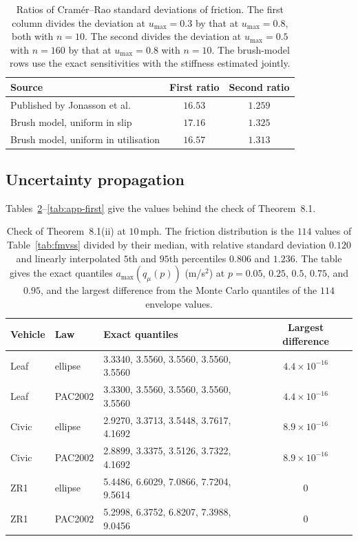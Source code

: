 \documentclass[12pt, twoside]{amsart}
\theoremstyle{definition}
\newcommand{\amax}{a_{\max}}
\newcommand{\mainref}[2]{#2}
\begin{document}
\begin{table}[htbp]
\centering\small
\caption{Ratios of Cram\'er--Rao standard deviations of friction. The first column divides the deviation at $u_{\max}=0.3$ by that at $u_{\max}=0.8$, both with $n=10$. The second divides the deviation at $u_{\max}=0.5$ with $n=160$ by that at $u_{\max}=0.8$ with $n=10$. The brush-model rows use the exact sensitivities with the stiffness estimated jointly.}\label{tab:app-volvo}
\begin{tabular}{lcc}
\toprule
Source & First ratio & Second ratio\\
\midrule
Published by Jonasson et al. & $16.53$ & $1.259$\\
Brush model, uniform in slip & $17.16$ & $1.325$\\
Brush model, uniform in utilisation & $16.57$ & $1.313$\\
\bottomrule
\end{tabular}
\end{table}
\FloatBarrier

\subsection{Uncertainty propagation}

Tables~\ref{tab:app-quant}--\ref{tab:app-first} give the values behind the check of
Theorem~\mainref{thm:propagation}{8.1}.

\begin{table}[htbp]
\centering\small
\caption{Check of Theorem~\mainref{thm:propagation}{8.1}\mainref{pr:quant}{{(ii)}} at $10$\,mph. The friction distribution is the $114$ values of Table~\ref{tab:fmvss} divided by their median, with relative standard deviation $0.120$ and linearly interpolated $5$th and $95$th percentiles $0.806$ and $1.236$. The table gives the exact quantiles $\amax(q_\mu(p))$ (m/s$^2$) at $p=0.05$, $0.25$, $0.5$, $0.75$, and $0.95$, and the largest difference from the Monte Carlo quantiles of the $114$ envelope values.}\label{tab:app-quant}
\begin{tabular}{llp{6.2cm}c}
\toprule
Vehicle & Law & Exact quantiles & Largest difference\\
\midrule
Leaf & ellipse & 3.3340, 3.5560, 3.5560, 3.5560, 3.5560 & $4.4\times10^{-16}$\\
Leaf & PAC2002 & 3.3300, 3.5560, 3.5560, 3.5560, 3.5560 & $4.4\times10^{-16}$\\
Civic & ellipse & 2.9270, 3.3713, 3.5448, 3.7617, 4.1692 & $8.9\times10^{-16}$\\
Civic & PAC2002 & 2.8899, 3.3375, 3.5126, 3.7322, 4.1692 & $8.9\times10^{-16}$\\
ZR1 & ellipse & 5.4486, 6.6029, 7.0866, 7.7204, 9.5614 & $0$\\
ZR1 & PAC2002 & 5.2998, 6.3752, 6.8207, 7.3988, 9.0456 & $0$\\
\bottomrule
\end{tabular}
\end{table}
\end{document}
